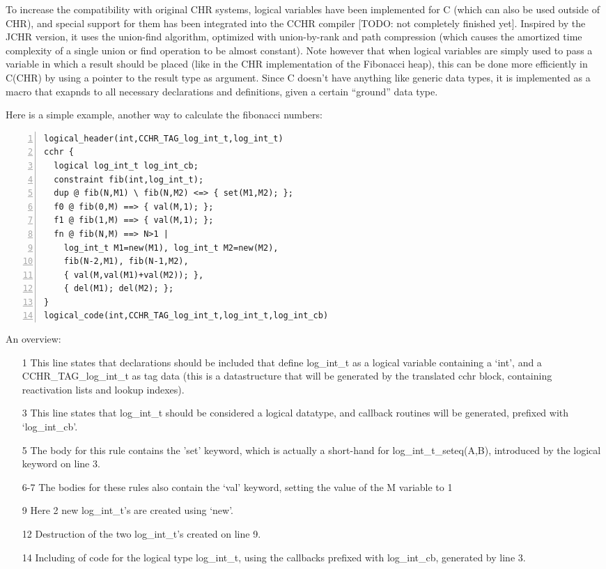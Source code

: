 \documentclass{llncs}
\begin{document}
To increase the compatibility with original CHR systems, logical variables have been implemented for C (which can also be
used outside of CHR), and special support for them has been integrated into the CCHR compiler [TODO: not completely finished yet].
Inspired by the JCHR version, it uses the union-find algorithm, optimized with union-by-rank and path compression (which causes the
amortized time complexity of a single union or find operation to be almost constant).
Note however that when logical variables are simply used to pass a variable in which a result should be placed (like in 
the CHR implementation of the Fibonacci heap), this can be done more efficiently in C(CHR) by using a pointer to the result
type as argument. Since C doesn't have anything like generic data types, it is implemented as a macro that exapnds to all
necessary declarations and definitions, given a certain ``ground'' data type.

Here is a simple example, another way to calculate the fibonacci numbers: \begin{Verbatim}[numbers=left]
logical_header(int,CCHR_TAG_log_int_t,log_int_t)
cchr {
  logical log_int_t log_int_cb;
  constraint fib(int,log_int_t);
  dup @ fib(N,M1) \ fib(N,M2) <=> { set(M1,M2); };
  f0 @ fib(0,M) ==> { val(M,1); };
  f1 @ fib(1,M) ==> { val(M,1); };
  fn @ fib(N,M) ==> N>1 |
    log_int_t M1=new(M1), log_int_t M2=new(M2),
    fib(N-2,M1), fib(N-1,M2),
    { val(M,val(M1)+val(M2)); },
    { del(M1); del(M2); };
}
logical_code(int,CCHR_TAG_log_int_t,log_int_t,log_int_cb)
\end{Verbatim}


An overview: \begin{itemize}
  \item[1] This line states that declarations should be included that define log\_int\_t as a logical variable containing a `int', and a CCHR\_TAG\_log\_int\_t as tag data (this is a datastructure that will be generated by the translated cchr block, containing reactivation lists and lookup indexes).
  \item[3] This line states that log\_int\_t should be considered a logical datatype, and callback routines will be generated, prefixed with `log\_int\_cb'.
  \item[5] The body for this rule contains the 'set' keyword, which is actually a short-hand for log\_int\_t\_seteq(A,B), introduced by the logical keyword on line 3.
  \item[6-7] The bodies for these rules also contain the `val' keyword, setting the value of the M variable to 1
  \item[9] Here 2 new log\_int\_t's are created using `new'.
  \item[12] Destruction of the two log\_int\_t's created on line 9.
  \item[14] Including of code for the logical type log\_int\_t, using the callbacks prefixed with log\_int\_cb, generated by line 3.
\end{itemize}
\end{document}
